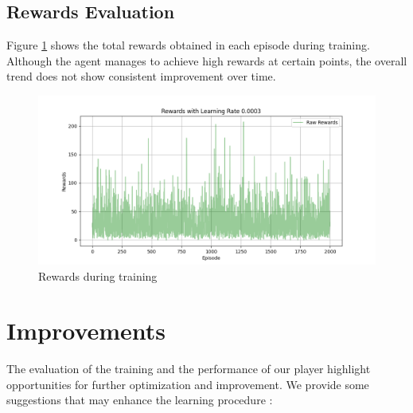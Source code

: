 \documentclass{article}
\begin{document}
\subsection{Rewards Evaluation}

Figure \ref{fig:rewards} shows the total rewards obtained in each episode during training. Although the agent manages to achieve high rewards at certain points, the overall trend does not show consistent improvement over time. 

\begin{figure}[h!]
    \centering
    \includegraphics[width=1\linewidth]{assets/rewards.png}
    \caption{Rewards during training}
    \label{fig:rewards}
\end{figure}

\newpage
\section{Improvements}
The evaluation of the training and the performance of our player highlight opportunities for further optimization and improvement. We provide some suggestions that may enhance the learning procedure :
\end{document}
